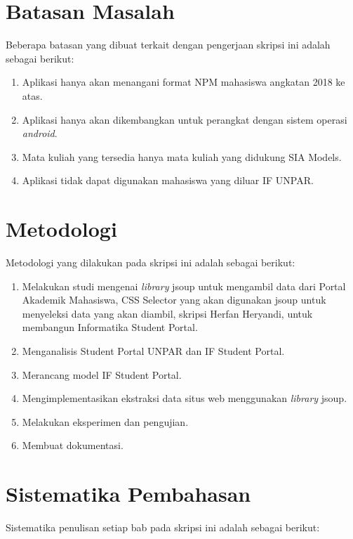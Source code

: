 \section{Batasan Masalah}
\label{sec:batasan}
Beberapa batasan yang dibuat terkait dengan pengerjaan skripsi ini adalah sebagai berikut:
\begin{enumerate}
	\item Aplikasi hanya akan menangani format NPM mahasiswa angkatan 2018 ke atas.
	\item Aplikasi hanya akan dikembangkan untuk perangkat dengan sistem operasi \textit{android}.
	\item Mata kuliah yang tersedia hanya mata kuliah yang didukung SIA Models.
	\item Aplikasi tidak dapat digunakan mahasiswa yang diluar IF UNPAR.
\end{enumerate}

\section{Metodologi}
\label{sec:metlit}
Metodologi yang dilakukan pada skripsi ini adalah sebagai berikut:

\begin{enumerate}
	\item Melakukan studi mengenai \textit{library} jsoup untuk mengambil data dari Portal Akademik Mahasiswa, CSS Selector yang akan digunakan jsoup untuk menyeleksi data yang akan diambil, skripsi Herfan Heryandi, untuk membangun Informatika Student Portal.
	\item Menganalisis Student Portal UNPAR dan IF Student Portal.
	\item Merancang model IF Student Portal.
	\item Mengimplementasikan ekstraksi data situs web menggunakan \textit{library} jsoup.
	\item Melakukan eksperimen dan pengujian.
	\item Membuat dokumentasi.
\end{enumerate}



\section{Sistematika Pembahasan}
\label{sec:sispem}
Sistematika penulisan setiap bab pada skripsi ini adalah sebagai berikut:

